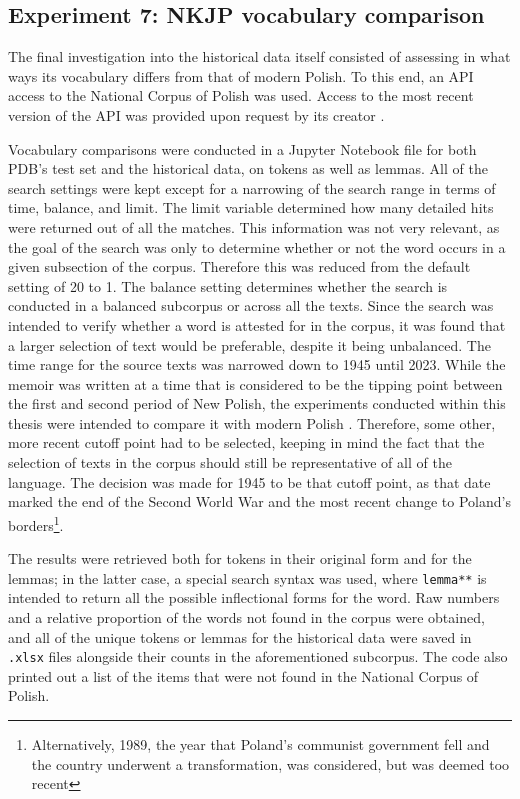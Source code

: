 \subsection{Experiment 7: NKJP vocabulary comparison}
\label{subsec:nkjp-vocab}

The final investigation into the historical data itself consisted of assessing in what ways its vocabulary differs from that of modern Polish. To this end, an API access to the National Corpus of Polish was used. Access to the most recent version of the API was provided upon request by its creator \citep{pęzik_2012}. 

Vocabulary comparisons were conducted in a Jupyter Notebook file for both PDB's test set and the historical data, on tokens as well as lemmas. All of the search settings were kept except for a narrowing of the search range in terms of time, balance, and limit. The limit variable determined how many detailed hits were returned out of all the matches. This information was not very relevant, as the goal of the search was only to determine whether or not the word occurs in a given subsection of the corpus. Therefore this was reduced from the default setting of 20 to 1. The balance setting determines whether the search is conducted in a balanced subcorpus or across all the texts. Since the search was intended to verify whether a word is attested for in the corpus, it was found that a larger selection of text would be preferable, despite it being unbalanced. The time range for the source texts was narrowed down to 1945 until 2023. While the memoir was written at a time that is considered to be the tipping point between the first and second period of New Polish, the experiments conducted within this thesis were intended to compare it with modern Polish \citep{długosz-kurczabowa_dubisz_2006}. Therefore, some other, more recent cutoff point had to be selected, keeping in mind the fact that the selection of texts in the corpus should still be representative of all of the language. The decision was made for 1945 to be that cutoff point, as that date marked the end of the Second World War and the most recent change to Poland's borders\footnote{Alternatively, 1989, the year that Poland's communist government fell and the country underwent a transformation, was considered, but was deemed too recent}.

The results were retrieved both for tokens in their original form and for the lemmas; in the latter case, a special search syntax was used, where \texttt{lemma**} is intended to return all the possible inflectional forms for the word. Raw numbers and a relative proportion of the words not found in the corpus were obtained, and all of the unique tokens or lemmas for the historical data were saved in \texttt{.xlsx} files alongside their counts in the aforementioned subcorpus. The code also printed out a list of the items that were not found in the National Corpus of Polish. 


